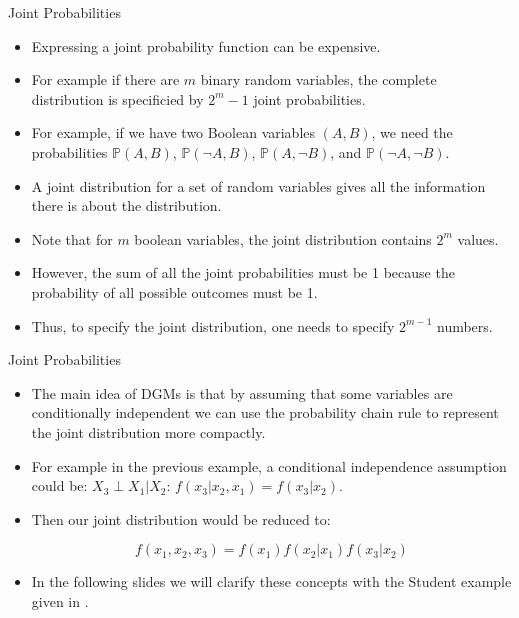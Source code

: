 \documentclass[handout]{beamer}
\begin{document}
\begin{frame}{Joint Probabilities}
\scriptsize{
\begin{itemize}

\item Expressing a joint probability function can be expensive.

\item For example if there are $m$ binary random variables, the complete distribution is specificied by $2^{m}-1$ joint probabilities.

\item For example, if we have two Boolean variables $(A,B)$, we need the probabilities $\mathbb{P}(A,B)$, $\mathbb{P}(\neg A,B)$, $\mathbb{P}(A,\neg B)$, and $\mathbb{P}(\neg A, \neg B)$.

\item A joint distribution for a set of random variables gives all the information there is about the distribution.


\item Note that for $m$ boolean variables, the joint distribution contains $2^m$ values. 

\item However, the sum of all the joint probabilities must be 1 because the probability of all possible outcomes must be 1. 

\item Thus, to specify the joint distribution, one needs to specify $2^{m-1}$ numbers.


\end{itemize}



} 

\end{frame}


\begin{frame}{Joint Probabilities}
\scriptsize{
\begin{itemize}



\item The main idea of DGMs is that by assuming that some variables are conditionally independent we can use the probability chain rule to represent the joint distribution more compactly.

\item For example in the previous example, a conditional independence assumption could be: $X_3 \perp X_1| X_2$: $f(x_3|x_2,x_1)= f(x_3|x_2)$.

\item Then our joint distribution would be reduced to:

\begin{displaymath}
f(x_1,x_2,x_3)=f(x_1)f(x_2|x_1)f(x_3|x_2)
 \end{displaymath}

 
\item In the following slides we will clarify these concepts with the Student example given in \cite{koller2009probabilistic}. 

\end{itemize}



} 

\end{frame}
\end{document}
